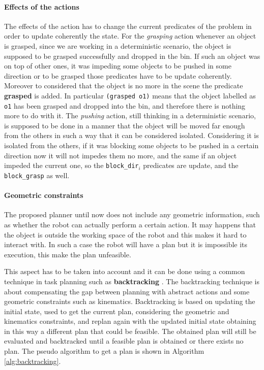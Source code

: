 \paragraph{Effects of the actions}
The effects of the action has to change the current predicates of the problem in order to update coherently the state. For the \textit{grasping} action whenever an object is grasped, since we are working in a deterministic scenario, the object is supposed to be grasped successfully and dropped in the bin. If such an object was on top of other ones, it was impeding some objects to be pushed in some direction or to be grasped those predicates have to be update coherently. Moreover to considered that the object is no more in the scene the predicate \textbf{grasped} is added. In particular \texttt{(grasped o1)} means that the object labelled as \texttt{o1} has been grasped and dropped into the bin, and therefore there is nothing more to do with it. The \textit{pushing} action, still thinking in a deterministic scenario, is supposed to be done in a manner that the object will be moved far enough from the others in such a way that it can be considered isolated. Considering it is isolated from the others, if it was blocking some objects to be pushed in a certain direction now it will not impedes them no more, and the same if an object impeded the current one, so the \texttt{block\_dir}$_i$ predicates are update, and the \texttt{block\_grasp} as well.  

	
\paragraph{Geometric constraints}
The proposed planner until now does not include any geometric information, such as whether the robot can actually perform a certain action. It may happens that the object is outside the working space of the robot and this makes it hard to interact with. In such a case the robot will have a plan but it is impossible its execution, this make the plan unfeasible. 

This aspect has to be taken into account and it can be done using a common technique in task planning such as \textbf{backtracking} \citep{Bidot2015}. The backtracking technique is about compensating the gap between planning with abstract actions and some geometric constraints such as kinematics. Backtracking is based on updating the initial state, used to get the current plan, considering the geometric and kinematics constraints, and replan again with the updated initial state obtaining in this way a different plan that could be feasible. The obtained plan will still be evaluated and backtracked until a feasible plan is obtained or there exists no plan. The pseudo algorithm to get a plan is shown in Algorithm \ref{alg:backtracking}.

